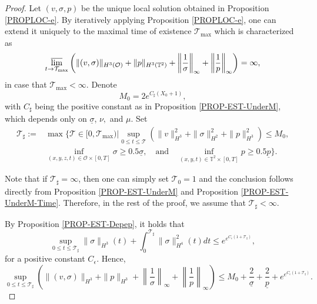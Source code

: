 \documentclass[12pt,reqno]{amsart}
\numberwithin{equation}{section}
\begin{document}
\begin{proof}
Let $(v,\sigma,p)$ be the unique local solution obtained in Proposition \ref{PROPLOC-e}. By iteratively applying Proposition \ref{PROPLOC-e},
one can extend it uniquely to the maximal time of existence $\mathcal T_\text{max}$ which is characterized as
\begin{equation}\label{TE*}
  \varlimsup_{t\rightarrow \mathcal T_\text{max}}\left(\|(v,\sigma)\|_{H^3(\mathcal O)}+\|p\|_{H^3(\mathbb T^2)}+\left\|\frac1\sigma\right\|_\infty+
  \left\|\frac1p\right\|_\infty\right)=\infty,
\end{equation}
in case that $\mathcal T_\text{max}<\infty$. Denote
$$
M_0=2e^{C_\sharp(X_0+1)},
$$
with $C_\sharp$ being the positive constant as in Proposition \ref{PROP-EST-UnderM}, which depends only on $\underline\sigma$, $\nu,$
and $\mu$. Set
\begin{align*}
  \mathcal T_\sharp:=&\max\bigg\{\mathcal T\in[0,\mathcal T_\text{max})\bigg|\sup_{0\leq t\leq\mathcal T}(\|v\|_{H^3}^2+\|\sigma\|_{H^2}^2+\|p\|_{H^3}^2)\leq M_0,\\
  &\inf_{(x,y,z,t)\in\mathcal O\times[0,T]}\sigma\geq0.5\underline\sigma,\quad \mbox{and}\quad\inf_{(x,y,t)\in\mathbb T^2\times[0, T]}p\geq0.5\underline p\bigg\}.
\end{align*}

Note that if $\mathcal T_\sharp=\infty$, then one can simply set $\mathcal T_0=1$ and the conclusion follows directly from Proposition \ref{PROP-EST-UnderM} and Proposition \ref{PROP-EST-UnderM-Time}.
Therefore, in the rest of the proof, we assume that $\mathcal T_\sharp<\infty$.

By Proposition \ref{PROP-EST-Depep}, it holds that
$$
\sup_{0\leq t\leq\mathcal T_\sharp}\|\sigma\|_{H^3}(t)+\int_0^{\mathcal T_\sharp}\|\sigma\|_{H^4}^2(t)dt
\leq e^{e^{C_\epsilon(1+\mathcal T_\sharp)}},
$$
for a positive constant $C_\epsilon$. Hence,
\begin{equation}\label{916}
  \sup_{0\leq t\leq\mathcal T_\sharp}\left(\|(v,\sigma)\|_{H^3}+\|p\|_{H^3}+\left\|\frac1\sigma\right\|_\infty+
  \left\|\frac1p\right\|_\infty\right)\leq M_0+\frac2{\underline\sigma}+\frac2{\underline p}+ e^{e^{C_\epsilon(1+\mathcal T_\sharp)}}.
\end{equation}


\end{proof}
\end{document}
